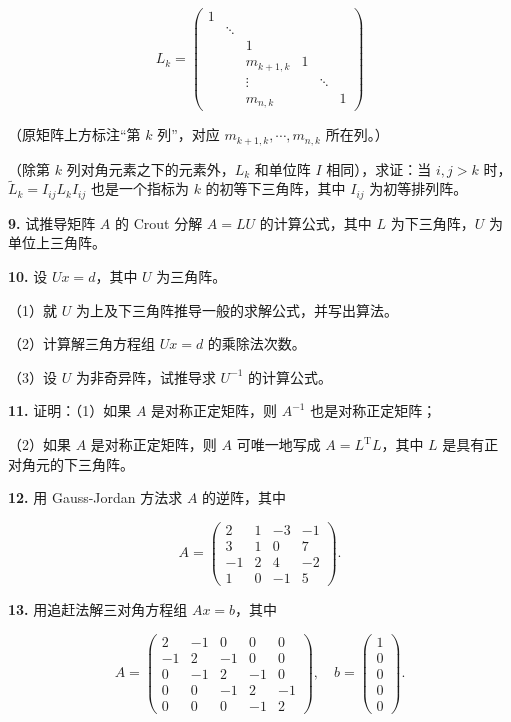 \documentclass[
  10pt,
  fontset=fandol]{ctexart}
\begin{document}
\[
L_k=\begin{pmatrix}
1&&&&&\\
&\ddots&&&&\\
&&1&&&\\
&&m_{k+1,k}&1&&\\
&&\vdots&&\ddots&\\
&&m_{n,k}&&&1
\end{pmatrix}
\]

（原矩阵上方标注``第 \(k\) 列''，对应 \(m_{k+1,k},\cdots,m_{n,k}\)
所在列。）

（除第 \(k\) 列对角元素之下的元素外，\(L_k\) 和单位阵 \(I\)
相同），求证：当 \(i,j>k\) 时，\(\widetilde L_k=I_{ij}L_kI_{ij}\)
也是一个指标为 \(k\) 的初等下三角阵，其中 \(I_{ij}\) 为初等排列阵。

\textbf{9.} 试推导矩阵 \(A\) 的 Crout 分解 \(A=LU\) 的计算公式，其中
\(L\) 为下三角阵，\(U\) 为单位上三角阵。

\textbf{10.} 设 \(Ux=d\)，其中 \(U\) 为三角阵。

（1）就 \(U\) 为上及下三角阵推导一般的求解公式，并写出算法。

（2）计算解三角方程组 \(Ux=d\) 的乘除法次数。

（3）设 \(U\) 为非奇异阵，试推导求 \(U^{-1}\) 的计算公式。

\textbf{11.} 证明：（1）如果 \(A\) 是对称正定矩阵，则 \(A^{-1}\)
也是对称正定矩阵；

（2）如果 \(A\) 是对称正定矩阵，则 \(A\) 可唯一地写成
\(A=L^{\mathrm T}L\)，其中 \(L\) 是具有正对角元的下三角阵。

\textbf{12.} 用 Gauss-Jordan 方法求 \(A\) 的逆阵，其中

\[
A=\begin{pmatrix}
2&1&-3&-1\\
3&1&0&7\\
-1&2&4&-2\\
1&0&-1&5
\end{pmatrix}.
\]

\textbf{13.} 用追赶法解三对角方程组 \(Ax=b\)，其中

\[
A=\begin{pmatrix}
2&-1&0&0&0\\
-1&2&-1&0&0\\
0&-1&2&-1&0\\
0&0&-1&2&-1\\
0&0&0&-1&2
\end{pmatrix},\quad
b=\begin{pmatrix}1\\0\\0\\0\\0\end{pmatrix}.
\]
\end{document}
